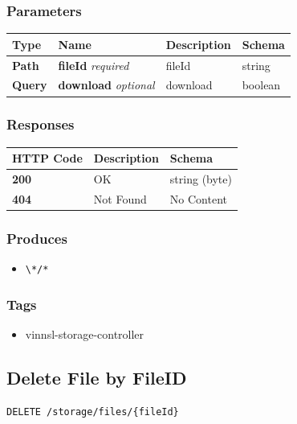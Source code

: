 \subsubsection{Parameters}\label{parameters-15}

\begin{longtable}[]{@{}llll@{}}
\toprule
Type & Name & Description & Schema\tabularnewline
\midrule
\endhead
\textbf{Path} & \textbf{fileId} \emph{required} & fileId &
string\tabularnewline
\textbf{Query} & \textbf{download} \emph{optional} & download &
boolean\tabularnewline
\bottomrule
\end{longtable}

\subsubsection{Responses}\label{responses-18}

\begin{longtable}[]{@{}lll@{}}
\toprule
HTTP Code & Description & Schema\tabularnewline
\midrule
\endhead
\textbf{200} & OK & string (byte)\tabularnewline
\textbf{404} & Not Found & No Content\tabularnewline
\bottomrule
\end{longtable}

\subsubsection{Produces}\label{produces-18}

\begin{itemize}
\tightlist
\item
  \texttt{\textbackslash{}*/*}
\end{itemize}

\subsubsection{Tags}\label{tags-18}

\begin{itemize}
\tightlist
\item
  vinnsl-storage-controller
\end{itemize}

\subsection{Delete File by FileID}\label{delete-file-by-fileid}

\begin{verbatim}
DELETE /storage/files/{fileId}
\end{verbatim}

